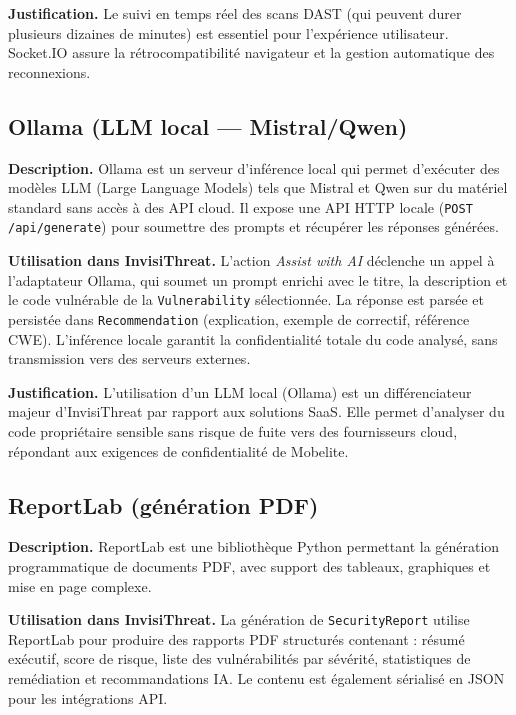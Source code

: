 \textbf{Justification.} Le suivi en temps réel des scans DAST (qui peuvent durer plusieurs dizaines de minutes) est essentiel pour l'expérience utilisateur. Socket.IO assure la rétrocompatibilité navigateur et la gestion automatique des reconnexions.

\subsection{Ollama (LLM local — Mistral/Qwen)}

\textbf{Description.} Ollama est un serveur d'inférence local qui permet d'exécuter des modèles LLM (Large Language Models) tels que Mistral et Qwen sur du matériel standard sans accès à des API cloud. Il expose une API HTTP locale (\texttt{POST /api/generate}) pour soumettre des prompts et récupérer les réponses générées.

\textbf{Utilisation dans InvisiThreat.} L'action \textit{Assist with AI} déclenche un appel à l'adaptateur Ollama, qui soumet un prompt enrichi avec le titre, la description et le code vulnérable de la \texttt{Vulnerability} sélectionnée. La réponse est parsée et persistée dans \texttt{Recommendation} (explication, exemple de correctif, référence CWE). L'inférence locale garantit la confidentialité totale du code analysé, sans transmission vers des serveurs externes.

\textbf{Justification.} L'utilisation d'un LLM local (Ollama) est un différenciateur majeur d'InvisiThreat par rapport aux solutions SaaS. Elle permet d'analyser du code propriétaire sensible sans risque de fuite vers des fournisseurs cloud, répondant aux exigences de confidentialité de Mobelite.

\subsection{ReportLab (génération PDF)}

\textbf{Description.} ReportLab est une bibliothèque Python permettant la génération programmatique de documents PDF, avec support des tableaux, graphiques et mise en page complexe.

\textbf{Utilisation dans InvisiThreat.} La génération de \texttt{SecurityReport} utilise ReportLab pour produire des rapports PDF structurés contenant : résumé exécutif, score de risque, liste des vulnérabilités par sévérité, statistiques de remédiation et recommandations IA. Le contenu est également sérialisé en JSON pour les intégrations API.

